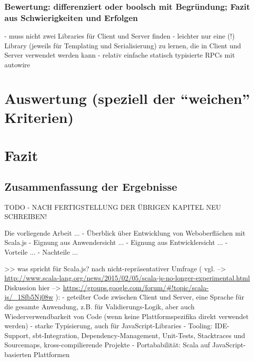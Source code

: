 \documentclass[a4paper, 12pt, hidelinks, listof=totoc, listoftables=totoc, bibliography=totoc]{scrreprt}
\begin{document}
\subsection{Bewertung: differenziert oder boolsch mit Begründung; Fazit aus Schwierigkeiten und Erfolgen}
- muss nicht zwei Libraries für Client und Server finden
- leichter nur eine (!) Library (jeweils für Templating und Serialisierung) zu lernen, die in Client und Server verwendet werden kann
\cite[\#SharingCode]{haoyi.HOS}
- relativ einfache statisch typisierte RPCs mit autowire


\chapter{Auswertung (speziell der "`weichen"' Kriterien)}


\chapter{Fazit}

\section{Zusammenfassung der Ergebnisse}

TODO - NACH FERTIGSTELLUNG DER ÜBRIGEN KAPITEL NEU SCHREIBEN!

Die vorliegende Arbeit ...
- Überblick über Entwicklung von Weboberflächen mit Scala.js
- Eignung aus Anwendersicht ...
- Eignung aus Entwicklersicht ...
- Vorteile ...
- Nachteile ...





>> was spricht für Scala.js?
    nach nicht-repräsentativer Umfrage (
      vgl.  -->  \url{http://www.scala-lang.org/news/2015/02/05/scala-js-no-longer-experimental.html}
      Diskussion hier  -->  \url{https://groups.google.com/forum/#!topic/scala-js/_1Sfb5Nj08w}
    ):
    - geteilter Code zwischen Client und Server, eine Sprache für die gesamte Anwendung, z.B. für Validierungs-Logik, aber auch Wiederverwendbarkeit von Code (wenn keine Plattformspezifika direkt verwendet werden)
    \cite{doeraene2013.CSJ}
    - starke Typisierung, auch für JavaScript-Libraries
    - Tooling: IDE-Support, sbt-Integration, Dependency-Management, Unit-Tests, Stacktraces und Sourcemaps, kross-compilierende Projekte
    - Portababilität: Scala auf JavaScript-basierten Plattformen
\end{document}
